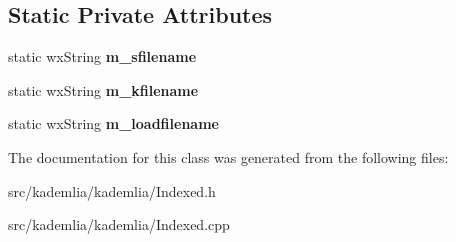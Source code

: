 \subsection*{Static Private Attributes}
\begin{DoxyCompactItemize}
\item 
static wxString {\bfseries m\_\-sfilename}\label{classKademlia_1_1CIndexed_ab8fb38ee5f4eaf7032c7b3874a78ad86}

\item 
static wxString {\bfseries m\_\-kfilename}\label{classKademlia_1_1CIndexed_a0b26c69dee43abe7e9f5ee7b11abb327}

\item 
static wxString {\bfseries m\_\-loadfilename}\label{classKademlia_1_1CIndexed_a4469a2e99f37be195f575a6e64cfee9e}

\end{DoxyCompactItemize}


The documentation for this class was generated from the following files:\begin{DoxyCompactItemize}
\item 
src/kademlia/kademlia/Indexed.h\item 
src/kademlia/kademlia/Indexed.cpp\end{DoxyCompactItemize}

